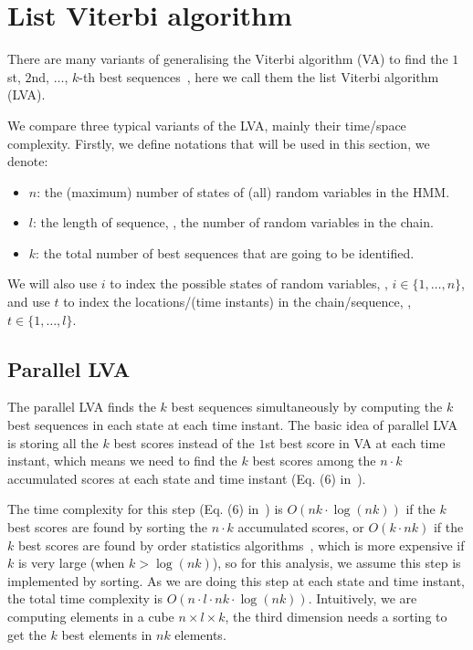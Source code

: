 \section{List Viterbi algorithm}
\label{sec:lva}

There are many variants of generalising the Viterbi algorithm (VA) to find the 
$1$st, $2$nd, $\dots$, $k$-th best sequences~\cite{seshadri1994list,nilsson2001sequentially},
here we call them the list Viterbi algorithm (LVA).

We compare three typical variants of the LVA, mainly their time/space complexity.
Firstly, we define notations that will be used in this section, we denote:
\begin{itemize}
\item $n$: the (maximum) number of states of (all) random variables in the HMM.
\item $l$: the length of sequence, \ie, the number of random variables in the chain.
\item $k$: the total number of best sequences that are going to be identified.
\end{itemize}
We will also use $i$ to index the possible states of random variables, \ie, $i \in \{1, \dots, n\}$,
and use $t$ to index the locations/(time instants) in the chain/sequence, \ie, $t \in \{1, \dots, l\}$.

\subsection{Parallel LVA}
\label{sec:plva}

The parallel LVA finds the $k$ best sequences simultaneously by computing the $k$ best sequences in each state at each time instant.
The basic idea of parallel LVA is storing all the $k$ best scores instead of the $1$st best score in VA at each time instant,
which means we need to find the $k$ best scores among the $n\cdot k$ accumulated scores at each state and time instant 
(Eq. (6) in~\cite{seshadri1994list}).

The time complexity for this step (Eq. (6) in~\cite{seshadri1994list})
is $O \left( nk\cdot \log(nk) \right)$ if the $k$ best scores are found by sorting the $n\cdot k$ accumulated scores,
or $O \left( k \cdot nk \right)$ if the $k$ best scores are found by order statistics algorithms~\cite{clrs2009}, 
which is more expensive if $k$ is very large (\ie when $k > \log(nk)$),
so for this analysis, we assume this step is implemented by sorting.
As we are doing this step at each state and time instant, the total time complexity is $O \left( n \cdot l \cdot nk \cdot \log(nk) \right)$.
Intuitively, we are computing elements in a cube $n \times l \times k$, 
the third dimension needs a sorting to get the $k$ best elements in $nk$ elements.

